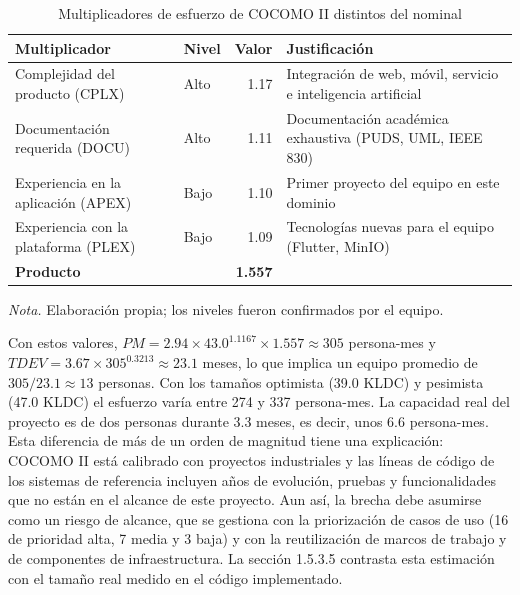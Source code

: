 \begin{table}[H]
\caption{Multiplicadores de esfuerzo de COCOMO II distintos del nominal}
\label{tab:cocomo_em}
\begin{threeparttable}
\begin{tabular}{>{\raggedright\arraybackslash}p{4.8cm} l r >{\raggedright\arraybackslash}p{4.6cm}}
\toprule
Multiplicador & Nivel & Valor & Justificación \\
\midrule
Complejidad del producto (CPLX) & Alto & 1.17 & Integración de web, móvil, servicio e inteligencia artificial \\
Documentación requerida (DOCU) & Alto & 1.11 & Documentación académica exhaustiva (PUDS, UML, IEEE 830) \\
Experiencia en la aplicación (APEX) & Bajo & 1.10 & Primer proyecto del equipo en este dominio \\
Experiencia con la plataforma (PLEX) & Bajo & 1.09 & Tecnologías nuevas para el equipo (Flutter, MinIO) \\
\midrule
\textbf{Producto} & & \textbf{1.557} & \\
\bottomrule
\end{tabular}
\begin{tablenotes}
\item \textit{Nota.} Elaboración propia; los niveles fueron confirmados por el equipo.
\end{tablenotes}
\end{threeparttable}
\end{table}

Con estos valores, $PM = 2.94 \times 43.0^{1.1167} \times 1.557 \approx 305$ persona-mes y $TDEV = 3.67 \times 305^{0.3213} \approx 23.1$ meses, lo que implica un equipo promedio de $305 / 23.1 \approx 13$ personas. Con los tamaños optimista (39.0 KLDC) y pesimista (47.0 KLDC) el esfuerzo varía entre 274 y 337 persona-mes. La capacidad real del proyecto es de dos personas durante 3.3 meses, es decir, unos 6.6 persona-mes. Esta diferencia de más de un orden de magnitud tiene una explicación: COCOMO II está calibrado con proyectos industriales y las líneas de código de los sistemas de referencia incluyen años de evolución, pruebas y funcionalidades que no están en el alcance de este proyecto. Aun así, la brecha debe asumirse como un riesgo de alcance, que se gestiona con la priorización de casos de uso (16 de prioridad alta, 7 media y 3 baja) y con la reutilización de marcos de trabajo y de componentes de infraestructura. La sección 1.5.3.5 contrasta esta estimación con el tamaño real medido en el código implementado.

